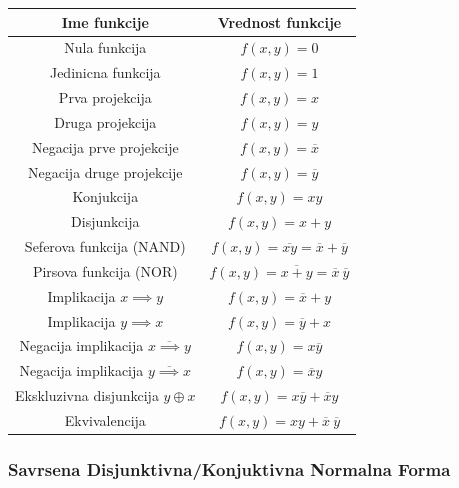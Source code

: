 \documentclass[12p,a4paper]{article}
\begin{document}
\begin{multicols}{2}
    \begin{tabular}{*{2}{c}}
        Ime funkcije                                    & Vrednost funkcije \\
        \midrule
        Nula funkcija                                   & $f(x, y) = 0$ \\
        Jedinicna funkcija                              & $f(x, y) = 1$ \\
        Prva projekcija                                 & $f(x, y) = x$ \\
        Druga projekcija                                & $f(x, y) = y$ \\
        Negacija prve projekcije                        & $f(x, y) = \overline{x}$ \\
        Negacija druge projekcije                       & $f(x, y) = \overline{y}$ \\
        Konjukcija                                      & $f(x, y) = x y$ \\
        Disjunkcija                                     & $f(x, y) = x + y$ \\
        Seferova funkcija (NAND)                        & $f(x, y) = \overline{xy} = \overline{x} + \overline{y}$ \\
        Pirsova funkcija (NOR)                          & $f(x, y) = \overline{x + y} = \overline{x} \ \overline{y}$ \\
        Implikacija $x \implies y$                      & $f(x, y) = \overline{x} + y$ \\
        Implikacija $y \implies x$                      & $f(x, y) = \overline{y} + x$ \\
        Negacija implikacija $\overline{x \implies y}$  & $f(x, y) = x \overline{y}$ \\
        Negacija implikacija $\overline{y \implies x}$  & $f(x, y) = \overline{x} y$ \\
        Ekskluzivna disjunkcija $y \oplus x$            & $f(x, y) = x \overline{y} + \overline{x} y$ \\
        Ekvivalencija                                   & $f(x, y) = x y + \overline{x} \ \overline{y}$ \\
    \end{tabular}

    \subsubsection{Savrsena Disjunktivna/Konjuktivna Normalna Forma}


\end{multicols}
\end{document}
